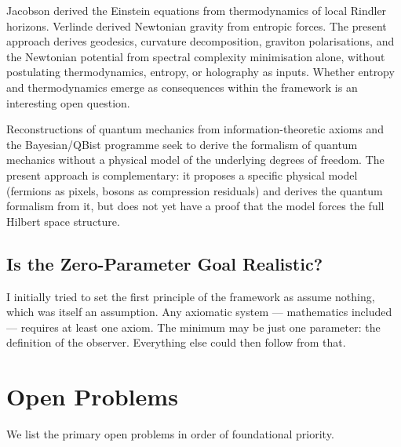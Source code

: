 \documentclass[11pt]{article}
\begin{document}
Jacobson \cite{jacobson1995} derived the Einstein equations from
thermodynamics of local Rindler horizons.
Verlinde \cite{verlinde2011} derived Newtonian gravity from entropic
forces.
The present approach derives geodesics, curvature decomposition,
graviton polarisations, and the Newtonian potential from spectral
complexity minimisation alone, without postulating thermodynamics,
entropy, or holography as inputs.
Whether entropy and thermodynamics emerge as consequences within the
framework is an interesting open question.

Reconstructions of quantum mechanics from information-theoretic axioms
\cite{hardy2001, chiribella2011} and the Bayesian/QBist programme
\cite{fuchs2014} seek to derive the formalism of quantum mechanics
without a physical model of the underlying degrees of freedom.
The present approach is complementary: it proposes a specific physical
model (fermions as pixels, bosons as compression residuals) and derives
the quantum formalism from it, but does not yet have a proof that the
model forces the full Hilbert space structure.


\subsection{Is the Zero-Parameter Goal Realistic?}

I initially tried to set the first principle of the framework as assume nothing,
which was itself an assumption.
Any axiomatic system — mathematics included — requires at least one axiom.
The minimum may be just one parameter: the definition of the observer.
Everything else could then follow from that.


\section{Open Problems}
\label{sec:open}

We list the primary open problems in order of foundational priority.
\end{document}
